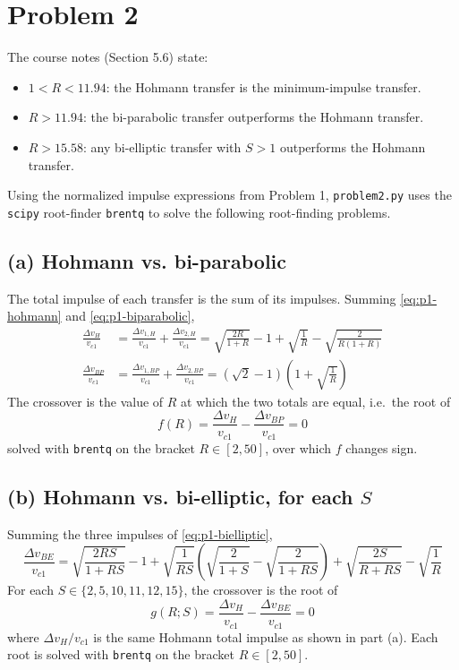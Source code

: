 \section{Problem 2}
\label{sec:problem2}

The course notes (Section 5.6) state:
\begin{itemize}
  \item $1 < R < 11.94$: the Hohmann transfer is the minimum-impulse transfer.
  \item $R > 11.94$: the bi-parabolic transfer outperforms the Hohmann transfer.
  \item $R > 15.58$: any bi-elliptic transfer with $S > 1$ outperforms the Hohmann transfer.
\end{itemize}

\noindent Using the normalized impulse expressions from Problem 1, \texttt{problem2.py} uses the \texttt{scipy} root-finder \texttt{brentq} to solve the following root-finding problems.

\subsection*{(a) Hohmann vs. bi-parabolic}

The total impulse of each transfer is the sum of its impulses. Summing \eqref{eq:p1-hohmann} and \eqref{eq:p1-biparabolic},
\begin{align*}
\frac{\Delta v_H}{v_{c1}} &= \frac{\Delta v_{1,H}}{v_{c1}} + \frac{\Delta v_{2,H}}{v_{c1}}
  = \sqrt{\frac{2R}{1+R}} - 1 + \sqrt{\frac{1}{R}} - \sqrt{\frac{2}{R(1+R)}}\\[4pt]
\frac{\Delta v_{BP}}{v_{c1}} &= \frac{\Delta v_{1,BP}}{v_{c1}} + \frac{\Delta v_{2,BP}}{v_{c1}}
  = \left(\sqrt{2}-1\right)\left(1+\sqrt{\frac{1}{R}}\right)
\end{align*}
The crossover is the value of $R$ at which the two totals are equal, i.e.\ the root of
\begin{equation}
\boxed{f(R) = \frac{\Delta v_H}{v_{c1}} - \frac{\Delta v_{BP}}{v_{c1}} = 0}
\label{eq:p2-fbp}
\end{equation}
solved with \texttt{brentq} on the bracket $R\in[2,50]$, over which $f$ changes sign.

\subsection*{(b) Hohmann vs. bi-elliptic, for each $S$}

Summing the three impulses of \eqref{eq:p1-bielliptic},
\begin{equation*}
\frac{\Delta v_{BE}}{v_{c1}} = \sqrt{\frac{2RS}{1+RS}} - 1
+ \sqrt{\frac{1}{RS}}\left(\sqrt{\frac{2}{1+S}} - \sqrt{\frac{2}{1+RS}}\right)
+ \sqrt{\frac{2S}{R+RS}} - \sqrt{\frac{1}{R}}
\end{equation*}
For each $S\in\{2,5,10,11,12,15\}$, the crossover is the root of
\begin{equation}
\boxed{g(R;S) = \frac{\Delta v_H}{v_{c1}} - \frac{\Delta v_{BE}}{v_{c1}} = 0}
\label{eq:p2-fbe}
\end{equation}
where $\Delta v_H/v_{c1}$ is the same Hohmann total impulse as shown in part (a). Each root is solved with \texttt{brentq} on the bracket $R\in[2,50]$.

